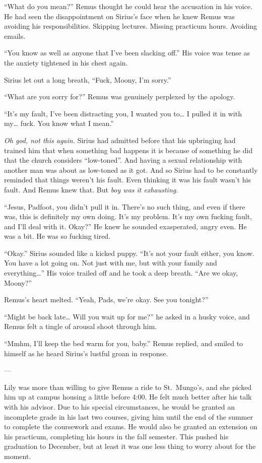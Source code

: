 \documentclass[12pt,twoside,openright]{memoir}
\begin{document}
``What do you mean?'' Remus thought he could hear the accusation in his voice. He had seen the disappointment on Sirius's face when he knew Remus was avoiding his responsibilities. Skipping lectures. Missing practicum hours. Avoiding emails.

``You know as well as anyone that I've been slacking off.'' His voice was tense as the anxiety tightened in his chest again.

Sirius let out a long breath, ``Fuck, Moony, I'm sorry.''

``What are you sorry for?'' Remus was genuinely perplexed by the apology.

``It's my fault, I've been distracting you, I wanted you to… I pulled it in with my… fuck. You know what I mean.''

\textit{Oh god, not this again.} Sirius had admitted before that his upbringing had trained him that when something bad happens it is because of something he did that the church considers ``low-toned''. And having a sexual relationship with another man was about as low-toned as it got. And so Sirius had to be constantly reminded that things weren't his fault. Even thinking it was his fault wasn't his fault. And Remus knew that. But \textit{boy was it exhausting.}

``Jesus, Padfoot, you didn't pull it in. There's no such thing, and even if there was, this is definitely my own doing. It's my problem. It's my own fucking fault, and I'll deal with it. Okay?'' He knew he sounded exasperated, angry even. He was a bit. He was so fucking tired.

``Okay.'' Sirius sounded like a kicked puppy. ``It's not your fault either, you know. You have a lot going on. Not just with me, but with your family and everything…'' His voice trailed off and he took a deep breath. ``Are we okay, Moony?''

Remus's heart melted. ``Yeah, Pads, we're okay. See you tonight?''

``Might be back late… Will you wait up for me?'' he asked in a husky voice, and Remus felt a tingle of arousal shoot through him.

``Mmhm, I'll keep the bed warm for you, baby.'' Remus replied, and smiled to himself as he heard Sirius's lustful groan in response. 

--- 

Lily was more than willing to give Remus a ride to St.\ Mungo's, and she picked him up at campus housing a little before
4:00. He felt much better after his talk with his advisor. Due to his special circumstances, he would be granted an incomplete grade in his last two courses, giving him until the end of the summer to complete the coursework and exams. He would also be granted an extension on his practicum, completing his hours in the fall semester. This pushed his graduation to December, but at least it was one less thing to worry about for the moment. 
\end{document}
